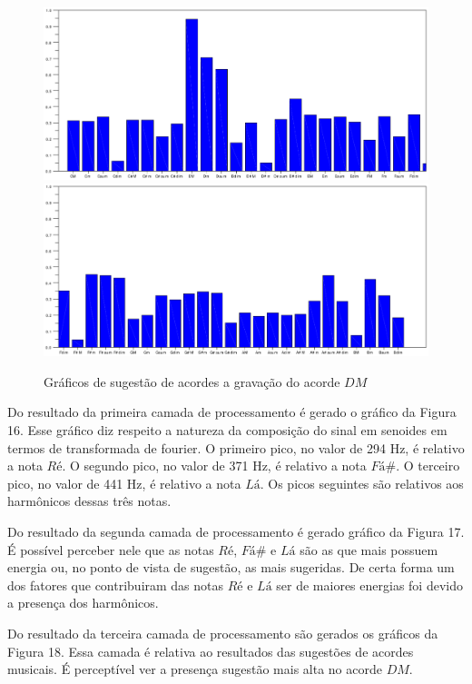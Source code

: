 \begin{figure}[h]
	\centering
		\includegraphics[keepaspectratio=true,scale=0.45]{figuras/Dm/acordes_1_DM.eps}
		\includegraphics[keepaspectratio=true,scale=0.45]{figuras/Dm/acordes_2_DM.eps}
	\caption{Gráficos de sugestão de acordes a gravação do acorde $DM$}
\end{figure}
\newpage
Do resultado da primeira camada de processamento é gerado o gráfico da Figura 16. Esse gráfico diz respeito a natureza da composição do sinal em senoides em termos de transformada de fourier. O primeiro pico, no valor de 294 Hz, é relativo a nota $Ré$. O segundo pico, no valor de 371 Hz, é relativo a nota $Fá\#$. O terceiro pico, no valor de 441 Hz, é relativo a nota $Lá$. Os picos seguintes são relativos aos harmônicos dessas três notas.

Do resultado da segunda camada de processamento é gerado gráfico da Figura 17. É possível perceber nele que as notas $Ré$, $Fá\#$ e $Lá$ são as que mais possuem energia ou, no ponto de vista de sugestão, as mais sugeridas. De certa forma um dos fatores que contribuiram das notas $Ré$ e $Lá$ ser de maiores energias foi devido a presença dos harmônicos.

Do resultado da terceira camada de processamento são gerados os gráficos da Figura 18. Essa camada é relativa ao resultados das sugestões de acordes musicais. É perceptível ver a presença sugestão mais alta no acorde $DM$.


